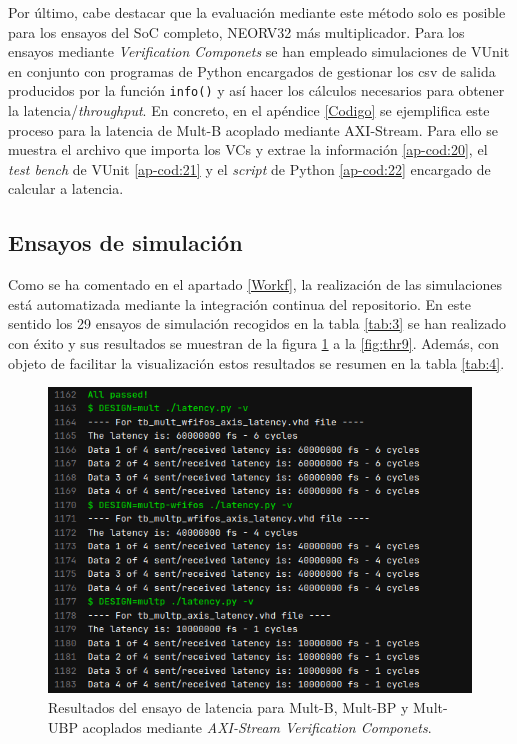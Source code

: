 Por último, cabe destacar que la evaluación mediante este método solo es posible para los ensayos del SoC completo, NEORV32 más multiplicador.
Para los ensayos mediante \textit{Verification Componets} se han empleado simulaciones de VUnit en conjunto con programas de Python encargados de gestionar los csv de salida producidos por la función \texttt{info()} y así hacer los cálculos necesarios para obtener la latencia/\textit{throughput}.
En concreto, en el apéndice \ref{Codigo} se ejemplifica este proceso para la latencia de Mult-B acoplado mediante AXI-Stream.
Para ello se muestra el archivo que importa los VCs y extrae la información \ref{ap-cod:20}, el \textit{test bench} de VUnit \ref{ap-cod:21} y el \textit{script} de Python \ref{ap-cod:22} encargado de calcular a latencia.

\subsection{Ensayos de simulación}


Como se ha comentado en el apartado \ref{Workf}, la realización de las simulaciones está automatizada mediante la integración continua del repositorio.
En este sentido los 29 ensayos de simulación recogidos en la tabla \ref{tab:3} se han realizado con éxito y sus resultados se muestran de la figura \ref{fig:lat1} a la \ref{fig:thr9}.
Además, con objeto de facilitar la visualización estos resultados se resumen en la tabla \ref{tab:4}.

\begin{figure}[H]
    \centering
    \includegraphics[width=14cm]{Figuras/result/lat1.png}
    \caption{Resultados del ensayo de latencia para Mult-B, Mult-BP y Mult-UBP acoplados mediante \textit{AXI-Stream Verification Componets}.}
    \label{fig:lat1}
\end{figure}

